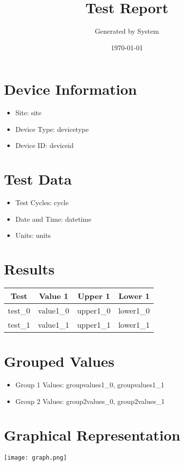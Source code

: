 \documentclass{article}
\begin{document}
\title{Test Report}
\author{Generated by System}
\date{\today}

\maketitle

\section{Device Information}
\begin{itemize}
    \item Site: {{site}}
    \item Device Type: {{devicetype}}
    \item Device ID: {{deviceid}}
\end{itemize}

\section{Test Data}
\begin{itemize}
    \item Test Cycles: {{cycle}}
    \item Date and Time: {{datetime}}
    \item Units: {{units}}
\end{itemize}

\section{Results}
\begin{tabular}{|c|c|c|c|}
\hline
Test & Value 1 & Upper 1 & Lower 1 \\
\hline
{{test_0}} & {{value1_0}} & {{upper1_0}} & {{lower1_0}} \\
{{test_1}} & {{value1_1}} & {{upper1_1}} & {{lower1_1}} \\
\hline
\end{tabular}

\section{Grouped Values}
\begin{itemize}
    \item Group 1 Values: {{groupvalues1_0}}, {{groupvalues1_1}}
    \item Group 2 Values: {{group2values_0}}, {{group2values_1}}
\end{itemize}

\section{Graphical Representation}
\texttt{[image: graph.png]}
\end{document}
